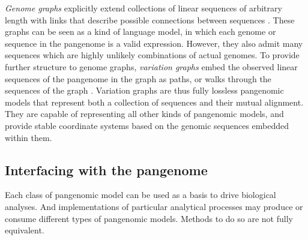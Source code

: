 \emph{Genome graphs} explicitly extend collections of linear sequences of arbitrary length with links that describe possible connections between sequences \cite{Paten_2017}.
These graphs can be seen as a kind of language model, in which each genome or sequence in the pangenome is a valid expression.
However, they also admit many sequences which are highly unlikely combinations of actual genomes.
To provide further structure to genome graphs, \emph{variation graphs} embed the observed linear sequences of the pangenome in the graph as paths, or walks through the sequences of the graph \cite{Garrison_2018}.
Variation graphs are thus fully lossless pangenomic models that represent both a collection of sequences and their mutual alignment.
They are capable of representing all other kinds of pangenomic models, and provide stable coordinate systems based on the genomic sequences embedded within them.





\subsection{Interfacing with the pangenome}

Each class of pangenomic model can be used as a basis to drive biological analyses.
And implementations of particular analytical processes may produce or consume different types of pangenomic models.
Methods to do so are not fully equivalent.


